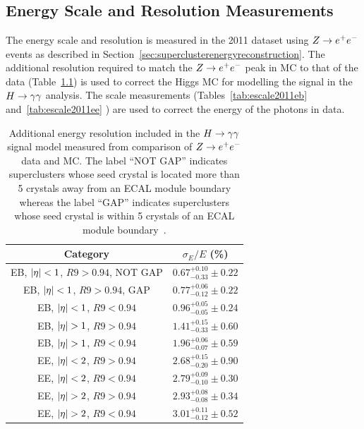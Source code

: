 \chapter{}
\section{Energy Scale and Resolution Measurements}
\label{app:escaleandresolutiontabs}

The energy scale and resolution is measured in the 2011 dataset using $Z\rightarrow e^{+}e^{-}$ events as 
described in Section~\ref{sec:superclusterenergyreconstruction}. 
The additional resolution required to match the 
$Z\rightarrow e^{+}e^{-}$ peak in MC to that of the data (Table~\ref{tab:eres2011}) is used to correct the 
Higgs MC for modelling the signal in the $H\rightarrow\gamma\gamma$ analysis.
The scale measurements (Tables~\ref{tab:escale2011eb} and~\ref{tab:escale2011ee} ) are used to correct the energy of the
photons in data. 
\begin{table}[hbt]
\centering
  \begin{tabular}{|c|c|}
    \hline
    Category    			& 	$\sigma_E/E$ (\%)     	  \\
    \hline				  			      
    EB, $|\eta| < 1$, $R9 > 0.94$, NOT GAP  & 	$0.67^{+0.10}_{-0.33} \pm 0.22$ \\
    EB, $|\eta| < 1$, $R9 > 0.94$, GAP  	& 	$0.77^{+0.06}_{-0.12} \pm 0.22$ \\
    EB, $|\eta| < 1$, $R9 < 0.94$  	& 	$0.96^{+0.05}_{-0.05} \pm 0.24$ \\
    EB, $|\eta| > 1$, $R9 > 0.94$ 	& 	$1.41^{+0.15}_{-0.33} \pm 0.60$ \\
    EB, $|\eta| > 1$, $R9 < 0.94$ 	&  	$1.96^{+0.06}_{-0.07} \pm 0.59$ \\
    \hline				  			      			     		     
    EE, $|\eta| < 2$, $R9 > 0.94$  	& 	$2.68^{+0.15}_{-0.20} \pm 0.90$\\
    EE, $|\eta| < 2$, $R9 < 0.94$  	& 	$2.79^{+0.09}_{-0.10} \pm 0.30$\\
    EE, $|\eta| > 2$, $R9 > 0.94$ 	& 	$2.93^{+0.08}_{-0.08} \pm 0.34$\\
    EE, $|\eta| > 2$, $R9 < 0.94$ 	& 	$3.01^{+0.11}_{-0.12} \pm 0.52$\\
    
    \hline
  \end{tabular}
\caption{Additional energy resolution  included in the $H\rightarrow\gamma\gamma$ signal model measured
from comparison of $Z\rightarrow e^{+}e^{-}$ data and MC. 
The label ``NOT GAP'' indicates 
superclusters whose seed crystal is located more 
than 5 crystals away from an ECAL module
boundary whereas the label ``GAP'' indicates superclusters whose seed crystal is within 5 crystals of an ECAL module boundary~\citep{AN-12-160}.}
\label{tab:eres2011}
\end{table} 

